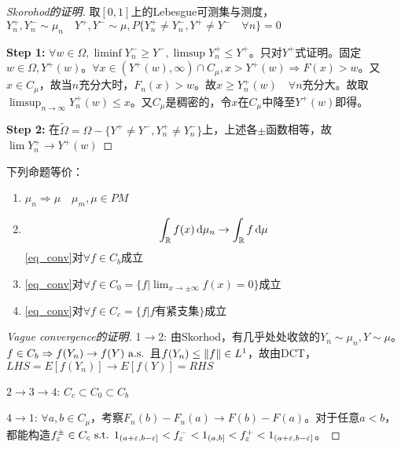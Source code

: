 \documentclass{ctexart}
\begin{document}
\begin{proof}[Skorohod的证明]
  取$[0,1]$上的Lebesgue可测集与测度，$Y_{n}^{+},Y_{n}^{-}\sim \mu_{n}\quad Y^{+},Y^{-}\sim \mu, P\{Y_{n}^{+}\neq Y_{n}^{-}, Y^{+}\neq Y^{-}\quad\forall n\}=0$

  \textbf{Step 1: } $\forall w\in\Omega,\liminf Y_{n}^{-}\geq Y^{-}, \limsup Y_{n}^{+}\leq Y^{+}$。只对$Y^{+}$式证明。固定$w\in\Omega, Y^{+}(w)$。$\forall x\in (Y^{+}(w),\infty)\cap C_{\mu},x>Y^{+}(w)\Rightarrow F(x)> w$。又$x\in C_{\mu}$，故当$n$充分大时，$F_{n}(x)>w$。故$x\geq Y_{n}^{+}(w)\quad \forall n$充分大。故取$\limsup_{n\to\infty}Y_{n}^{+}(w)\leq x$。又$C_{\mu}$是稠密的，令$x$在$C_{\mu}$中降至$Y^{+}(w)$即得。

  \textbf{Step 2: } 在$\tilde\Omega=\Omega-\{Y^{+}\neq Y^{-}, Y^{+}_{n}\neq Y^{-}_{n}\}$上，上述各$\pm$函数相等，故$\lim Y_{n}^{+}\to Y^{+}(w)$
  
\end{proof}

\begin{Thm}
  下列命题等价：
  \begin{enumerate}
  \item $\mu_{n}\Rightarrow \mu\quad \mu_{m},\mu\in PM$
  \item
    \begin{equation}\label{eq_conv}
      \int_{\mathbb{R}}f(x)\,\mathrm{d}\mu_{n}\to \int_{\mathbb{R}}f\,\mathrm{d}\mu
    \end{equation}
   \ref{eq_conv}对$\forall f\in C_{b}$成立
 \item \ref{eq_conv}对$\forall f\in C_{0}=\{f|\lim_{x\to\pm\infty}f(x)=0\}$成立
 \item \ref{eq_conv}对$\forall f\in C_{c}=\{f|f\text{有紧支集}\}$成立
  \end{enumerate}
\end{Thm}

\begin{proof}[Vague convergence的证明]
  1$\to$2: 由Skorhod，有几乎处处收敛的$Y_{n}\sim\mu_{n},Y\sim\mu$。$f\in C_{b}\Rightarrow f(Y_{n})\to f(Y)\text{ a.s. }$且$f(Y_{n})\leq\left\|f\right\|\in L^{1}$，故由DCT，$LHS=E[f(Y_{n})]\to E[f(Y)]=RHS$

  $2\to 3\to 4$: $C_{c}\subset C_{0}\subset C_{b}$

  $4\to 1$: $\forall a,b\in C_{\mu}$，考察$F_{n}(b)-F_{n}(a)\to F(b)-F(a)$。对于任意$a<b$，都能构造$f_{\varepsilon}^{\pm}\in C_{c}\text{ s.t. } 1_{(a+\varepsilon,b-\varepsilon]}<f_{\varepsilon}^{-}<1_{(a,b]}<f^{+}_{\varepsilon}<1_{(a+\varepsilon,b-\varepsilon]}$。
\end{proof}
\end{document}

